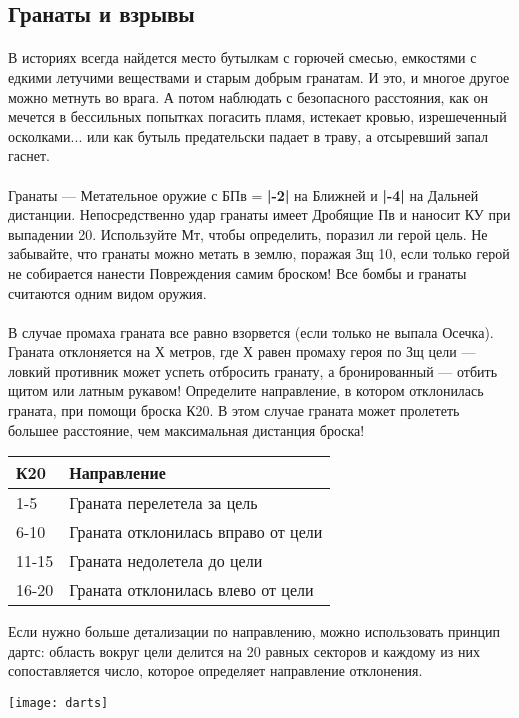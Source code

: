 \subsection{Гранаты и взрывы}
\paragraph{}
В историях всегда найдется место бутылкам с горючей смесью, емкостями с едкими летучими веществами и старым добрым гранатам. И это, и многое другое можно метнуть во врага. А потом наблюдать с безопасного расстояния, как он мечется в бессильных попытках погасить пламя, истекает кровью, изрешеченный осколками... или как бутыль предательски падает в траву, а отсыревший запал гаснет.
\paragraph{}
Гранаты — Метательное оружие с БПв = \textbf{|-2|} на Ближней и \textbf{|-4|} на Дальней дистанции. Непосредственно удар гранаты имеет Дробящие Пв и наносит КУ при выпадении 20. Используйте Мт, чтобы определить, поразил ли герой цель. Не забывайте, что гранаты можно метать в землю, поражая Зщ 10, если только герой не собирается нанести Повреждения самим броском!
\newline
Все бомбы и гранаты считаются одним видом оружия.
\paragraph{}
В случае промаха граната все равно взорвется (если только не выпала Осечка). Граната отклоняется на Х метров, где Х равен промаху героя по Зщ цели — ловкий противник может успеть отбросить гранату, а бронированный — отбить щитом или латным рукавом! Определите направление, в котором отклонилась граната, при помощи броска К20. В этом случае граната может пролететь большее расстояние, чем максимальная дистанция броска!
\begin{center}
\begin{tabular}{ |p{2.7cm}|p{12cm}| }
\hline
\textbf{К20} & \textbf{Направление}
\\ \hline
1-5 & Граната перелетела за цель
\\ \hline
6-10 & Граната отклонилась вправо от цели
\\ \hline
11-15 & Граната недолетела до цели
\\ \hline
16-20 & Граната отклонилась влево от цели
\\ \hline
\end{tabular}
\end{center}
\begin{tcolorbox}
Если нужно больше детализации по направлению, можно использовать принцип дартс: область вокруг цели делится на 20 равных секторов и каждому из них сопоставляется число, которое определяет направление отклонения.
\newline
\begin{center}
\texttt{[image: darts]}
\end{center}
\end{tcolorbox}

